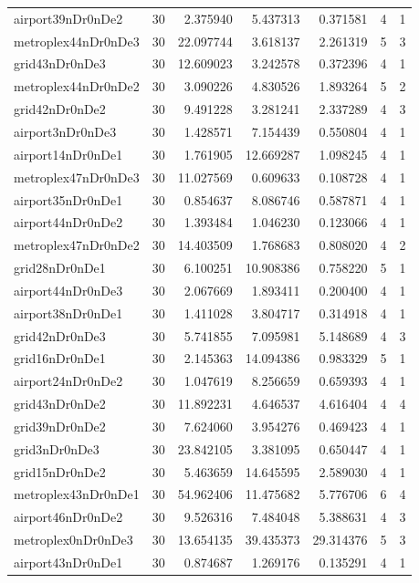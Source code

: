 \begin{longtable}{|l|r|r|r|r|r|r|}
airport39nDr0nDe2 & 30 & 2.375940 & 5.437313 & 0.371581 & 4 & 1 \\
metroplex44nDr0nDe3 & 30 & 22.097744 & 3.618137 & 2.261319 & 5 & 3 \\
grid43nDr0nDe3 & 30 & 12.609023 & 3.242578 & 0.372396 & 4 & 1 \\
metroplex44nDr0nDe2 & 30 & 3.090226 & 4.830526 & 1.893264 & 5 & 2 \\
grid42nDr0nDe2 & 30 & 9.491228 & 3.281241 & 2.337289 & 4 & 3 \\
airport3nDr0nDe3 & 30 & 1.428571 & 7.154439 & 0.550804 & 4 & 1 \\
airport14nDr0nDe1 & 30 & 1.761905 & 12.669287 & 1.098245 & 4 & 1 \\
metroplex47nDr0nDe3 & 30 & 11.027569 & 0.609633 & 0.108728 & 4 & 1 \\
airport35nDr0nDe1 & 30 & 0.854637 & 8.086746 & 0.587871 & 4 & 1 \\
airport44nDr0nDe2 & 30 & 1.393484 & 1.046230 & 0.123066 & 4 & 1 \\
metroplex47nDr0nDe2 & 30 & 14.403509 & 1.768683 & 0.808020 & 4 & 2 \\
grid28nDr0nDe1 & 30 & 6.100251 & 10.908386 & 0.758220 & 5 & 1 \\
airport44nDr0nDe3 & 30 & 2.067669 & 1.893411 & 0.200400 & 4 & 1 \\
airport38nDr0nDe1 & 30 & 1.411028 & 3.804717 & 0.314918 & 4 & 1 \\
grid42nDr0nDe3 & 30 & 5.741855 & 7.095981 & 5.148689 & 4 & 3 \\
grid16nDr0nDe1 & 30 & 2.145363 & 14.094386 & 0.983329 & 5 & 1 \\
airport24nDr0nDe2 & 30 & 1.047619 & 8.256659 & 0.659393 & 4 & 1 \\
grid43nDr0nDe2 & 30 & 11.892231 & 4.646537 & 4.616404 & 4 & 4 \\
grid39nDr0nDe2 & 30 & 7.624060 & 3.954276 & 0.469423 & 4 & 1 \\
grid3nDr0nDe3 & 30 & 23.842105 & 3.381095 & 0.650447 & 4 & 1 \\
grid15nDr0nDe2 & 30 & 5.463659 & 14.645595 & 2.589030 & 4 & 1 \\
metroplex43nDr0nDe1 & 30 & 54.962406 & 11.475682 & 5.776706 & 6 & 4 \\
airport46nDr0nDe2 & 30 & 9.526316 & 7.484048 & 5.388631 & 4 & 3 \\
metroplex0nDr0nDe3 & 30 & 13.654135 & 39.435373 & 29.314376 & 5 & 3 \\
airport43nDr0nDe1 & 30 & 0.874687 & 1.269176 & 0.135291 & 4 & 1 \\

\end{longtable}
